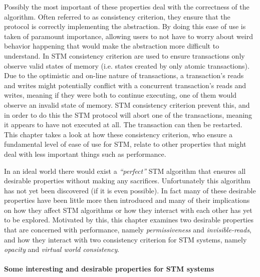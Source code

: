 \documentclass[runningheads,a4paper]{article}
\begin{document}
Possibly the most important of these properties deal with the correctness of the algorithm.
Often referred to as consistency criterion, they ensure that the protocol is correctly implementing
the abstraction.
By doing this ease of use is taken of paramount importance, allowing users to not have to worry about weird behavior happening that would make
the abstraction more difficult to understand.
In STM consistency criterion are used to ensure transactions only observe valid states of
memory (i.e. states created by only atomic transactions).
Due to the optimistic and on-line nature of transactions, a transaction's reads and writes
might potentially conflict with a concurrent transaction's reads and writes, meaning
if they were both to continue executing, one of them would observe an invalid state of memory.
STM consistency criterion prevent this, and in order to do this the STM protocol will abort
one of the transactions, meaning it appears to have not executed at all.
The transaction can then be restarted.
This chapter takes a look at how these consistency criterion, who ensure a fundamental level of ease of use
for STM, relate to other properties that might deal with less important things such as performance.



In an ideal world there would exist a \emph{``perfect''} STM algorithm that ensures all desirable properties
without making any sacrifices.
Unfortunately this algorithm has not yet been discovered (if it is even possible).
In fact many of these desirable properties have been little more then introduced and many of their implications
on how they affect STM algorithms or how they interact with each other has yet to be explored.
Motivated by this, this chapter examines two desirable properties that are concerned with performance,
namely \emph{permissiveness} and \emph{invisible-reads}, and how they interact with two consistency
criterion for STM systems, namely \emph{opacity} and \emph{virtual world consistency}.


\paragraph{Some interesting and desirable properties for STM systems}
\end{document}

